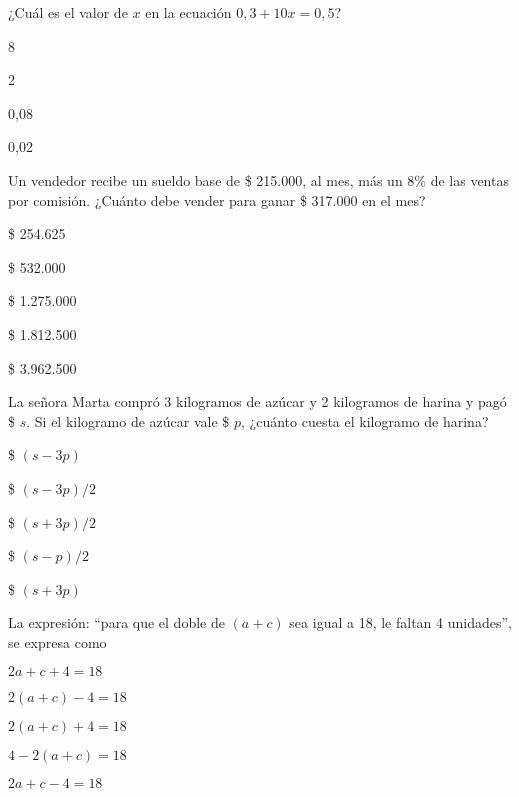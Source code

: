 \documentclass{sn-guia}
\begin{document}
\begin{problemas}
    \problema ¿Cuál es el valor de $x$ en la ecuación $0,3 + 10x = 0,5$?
    \begin{alternativas}[]
        \item 8
        \item 2
        \item 0,08
        \item 0,02
    \end{alternativas}

    \problema Un vendedor recibe un sueldo base de \$ 215.000, al mes, más un 8\% de las 
    ventas por comisión. ¿Cuánto debe vender para ganar \$ 317.000 en el mes?
    \begin{alternativas}
        \item \$ 254.625
        \item \$ 532.000
        \item \$ 1.275.000
        \item \$ 1.812.500
        \item \$ 3.962.500
    \end{alternativas}
    \problema La señora Marta compró 3 kilogramos de azúcar y 2 kilogramos de harina y 
    pagó \$ $s$. Si el kilogramo de azúcar vale \$ $p$, ¿cuánto cuesta el kilogramo de 
    harina?
    \begin{alternativas}
        \item \$ $\left( s-3p \right)$
        \item \$ $\left( s-3p \right)/2$
        \item \$ $\left( s+3p \right)/2$
        \item \$ $\left( s-p \right)/2$
        \item \$ $\left( s+3p \right)$
    \end{alternativas}

    \problema La expresión: ``para que el doble de $(a+c)$ sea igual a 18, le faltan
    4 unidades'', se expresa como
    \begin{alternativas}[]
        \item $2a + c + 4 = 18$
        \item $2(a+c) -4 = 18$
        \item $2(a+c) + 4 = 18$
        \item $4 - 2(a+c) = 18$
        \item $2a +c -4 = 18$
    \end{alternativas}


\end{problemas}
\end{document}
